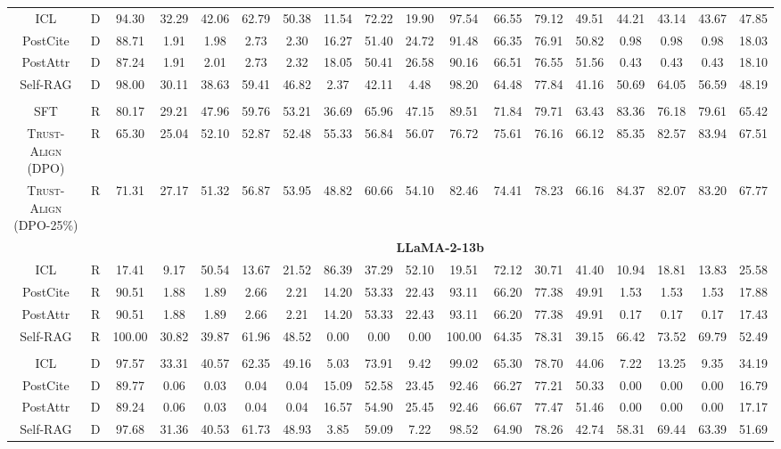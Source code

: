 \documentclass{article} %
\newcommand{\method}[0]{\textsc{Trust-Align}}
\begin{document}
\begin{table}[htb!]
{\begin{tabular}{ccc*{15}c}
ICL & D & 94.30 & 32.29 & 42.06 & 62.79 & 50.38 & 11.54 & 72.22 & 19.90 & 97.54 & 66.55 & 79.12 & 49.51 & 44.21 & 43.14 & 43.67 & 47.85 \\
PostCite & D & 88.71 & 1.91 & 1.98 & 2.73 & 2.30 & 16.27 & 51.40 & 24.72 & 91.48 & 66.35 & 76.91 & 50.82 & 0.98 & 0.98 & 0.98 & 18.03 \\
PostAttr & D  & 87.24 & 1.91 & 2.01 & 2.73 & 2.32 & 18.05 & 50.41 & 26.58 & 90.16 & 66.51 & 76.55 & 51.56 & 0.43 & 0.43 & 0.43 & 18.10 \\
Self-RAG & D & 98.00 & 30.11 & 38.63 & 59.41 & 46.82 & 2.37 & 42.11 & 4.48 & 98.20 & 64.48 & 77.84 & 41.16 & 50.69 & 64.05 & 56.59 & 48.19 \\\\

SFT & R & 80.17 & 29.21 & 47.96 & 59.76 & 53.21 & 36.69 & 65.96 & 47.15 & 89.51 & 71.84 & 79.71 & 63.43 & 83.36 & 76.18 & 79.61 & 65.42 \\
\method{} (DPO) & R & 65.30 & 25.04 & 52.10 & 52.87 & 52.48 & 55.33 & 56.84 & 56.07 & 76.72 & 75.61 & 76.16 & 66.12 & 85.35 & 82.57 & 83.94 & 67.51 \\
\method{} (DPO-25\%) & R & 71.31 & 27.17 & 51.32 & 56.87 & 53.95 & 48.82 & 60.66 & 54.10 & 82.46 & 74.41 & 78.23 & 66.16 & 84.37 & 82.07 & 83.20 & 67.77 \\

& & \multicolumn{16}{c}{\cellcolor[gray]{0.9}\textbf{LLaMA-2-13b}} \\
ICL & R & 17.41 & 9.17 & 50.54 & 13.67 & 21.52 & 86.39 & 37.29 & 52.10 & 19.51 & 72.12 & 30.71 & 41.40 & 10.94 & 18.81 & 13.83 & 25.58 \\
PostCite & R & 90.51 & 1.88 & 1.89 & 2.66 & 2.21 & 14.20 & 53.33 & 22.43 & 93.11 & 66.20 & 77.38 & 49.91 & 1.53 & 1.53 & 1.53 & 17.88 \\
PostAttr & R & 90.51 & 1.88 & 1.89 & 2.66 & 2.21 & 14.20 & 53.33 & 22.43 & 93.11 & 66.20 & 77.38 & 49.91 & 0.17 & 0.17 & 0.17 & 17.43 \\

Self-RAG & R & 100.00 & 30.82 & 39.87 & 61.96 & 48.52 & 0.00 & 0.00 & 0.00 & 100.00 & 64.35 & 78.31 & 39.15 & 66.42 & 73.52 & 69.79 & 52.49 \\\\
ICL & D & 97.57 & 33.31 & 40.57 & 62.35 & 49.16 & 5.03 & 73.91 & 9.42 & 99.02 & 65.30 & 78.70 & 44.06 & 7.22 & 13.25 & 9.35 & 34.19 \\
PostCite & D  & 89.77 & 0.06 & 0.03 & 0.04 & 0.04 & 15.09 & 52.58 & 23.45 & 92.46 & 66.27 & 77.21 & 50.33 & 0.00 & 0.00 & 0.00 & 16.79 \\
PostAttr & D & 89.24 & 0.06 & 0.03 & 0.04 & 0.04 & 16.57 & 54.90 & 25.45 & 92.46 & 66.67 & 77.47 & 51.46 & 0.00 & 0.00 & 0.00 & 17.17 \\
Self-RAG & D & 97.68 & 31.36 & 40.53 & 61.73 & 48.93 & 3.85 & 59.09 & 7.22 & 98.52 & 64.90 & 78.26 & 42.74 & 58.31 & 69.44 & 63.39 & 51.69 \\


\end{tabular}}
\end{table}
\end{document}
